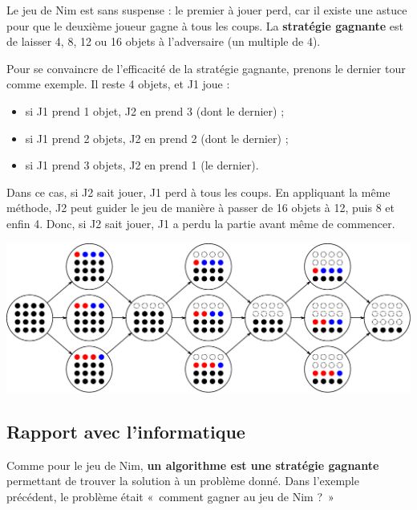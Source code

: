 \documentclass[a5paper,pagesize,DIV=14]{scrbook}
\begin{document}
Le jeu de Nim est sans suspense : le premier à jouer perd, car il existe une astuce pour que le deuxième joueur gagne à tous les coups. La \textbf{stratégie gagnante} est de laisser 4, 8, 12 ou 16 objets à l'adversaire (un multiple de 4).

Pour se convaincre de l'efficacité de la stratégie gagnante, prenons le dernier tour comme exemple. Il reste 4 objets, et J1 joue :

\begin{itemize}
  \item si J1 prend 1 objet, J2 en prend 3 (dont le dernier) ;
  \item si J1 prend 2 objets, J2 en prend 2 (dont le dernier) ;
  \item si J1 prend 3 objets, J2 en prend 1 (le dernier).
\end{itemize}        

Dans ce cas, si J2 sait jouer, J1 perd à tous les coups. En appliquant la même méthode, J2 peut guider le jeu de manière à passer de 16 objets à 12, puis 8 et enfin 4. Donc, si J2 sait jouer, J1 a perdu la partie avant même de commencer.

\begin{center}
  \includegraphics[width=\linewidth]{img/nim16.pdf}
\end{center}

\subsection*{Rapport avec l'informatique}

Comme pour le jeu de Nim, \textbf{un algorithme est une stratégie gagnante}
permettant de trouver la solution à un problème donné. Dans l'exemple
précédent, le problème était «~comment gagner au jeu de Nim ?~»

\end{document}
